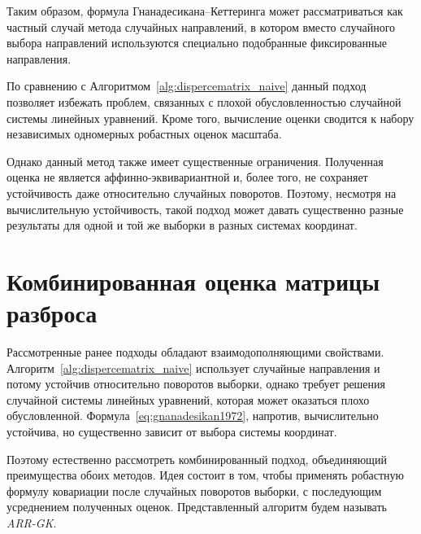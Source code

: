 
Таким образом, формула Гнанадесикана--Кеттеринга может рассматриваться как частный случай метода случайных направлений, в котором вместо случайного выбора направлений используются специально подобранные фиксированные направления.

По сравнению с Алгоритмом~\ref{alg:dispercematrix_naive} данный подход позволяет избежать проблем, связанных с плохой обусловленностью случайной системы линейных уравнений. Кроме того, вычисление оценки сводится к набору независимых одномерных робастных оценок масштаба.

Однако данный метод также имеет существенные ограничения. Полученная оценка не является аффинно-эквивариантной и, более того, не сохраняет устойчивость даже относительно случайных поворотов. Поэтому, несмотря на вычислительную устойчивость, такой подход может давать существенно разные результаты для одной и той же выборки в разных системах координат.

\section{Комбинированная оценка матрицы разброса}

Рассмотренные ранее подходы обладают взаимодополняющими свойствами. Алгоритм~\ref{alg:dispercematrix_naive} использует случайные направления и потому устойчив относительно поворотов выборки, однако требует решения случайной системы линейных уравнений, которая может оказаться плохо обусловленной. Формула~\eqref{eq:gnanadesikan1972}, напротив, вычислительно устойчива, но существенно зависит от выбора системы координат.

Поэтому естественно рассмотреть комбинированный подход, объединяющий преимущества обоих методов. Идея состоит в том, чтобы применять робастную формулу ковариации после случайных поворотов выборки, с последующим усреднением полученных оценок. Представленный алгоритм будем называть \emph{ARR-GK}.

